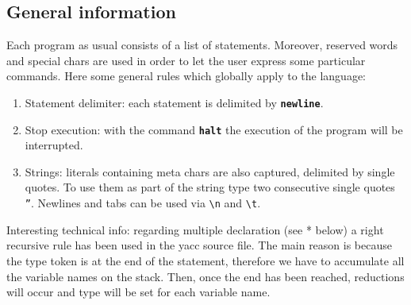 \documentclass[12pt]{article}
\begin{document}
\subsection{General information}
Each program as usual consists of a list of statements. Moreover, reserved words and special chars are used in order to let the user express some particular commands. Here some general rules which globally apply to the language:
\begin{enumerate}
\item Statement delimiter: each statement is delimited by \texttt{\textbf{newline}}.
\item Stop execution: with the command \texttt{\textbf{halt}} the execution of the program will be interrupted.
\item Strings: literals containing meta chars are also captured, delimited by single quotes. To use them as part of the string type two consecutive single quotes \texttt{''}. Newlines and tabs can be used via \texttt{\textbackslash n} and \texttt{\textbackslash t}.
\end{enumerate}
Interesting technical info: regarding multiple declaration (see * below) a right recursive rule has been used in the yacc source file. The main reason is because the type token is at the end of the statement, therefore we have to accumulate all the variable names on the stack. Then, once the end has been reached, reductions will occur and type will be set for each variable name.
\vspace{2cm}
\end{document}
